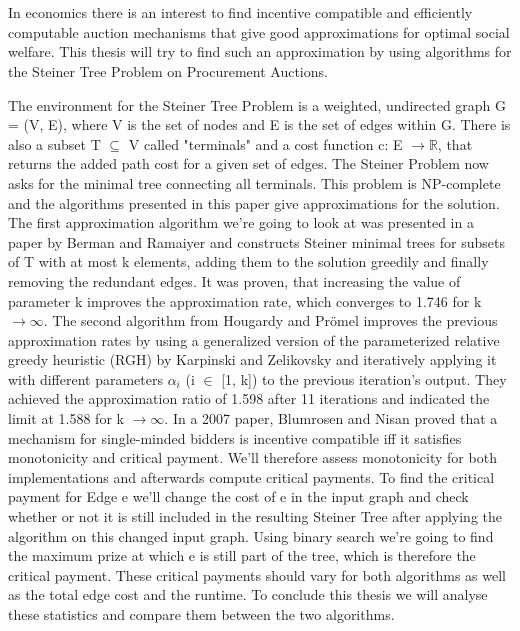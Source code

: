 \chapter{\abstractname}


In economics there is an interest to find incentive compatible and efficiently computable auction mechanisms that give good approximations for optimal social welfare. This thesis will try to find such an approximation by using algorithms for the Steiner Tree Problem on Procurement Auctions.%

The environment for the Steiner Tree Problem is a weighted, undirected graph G = (V, E), where V is the set of nodes and E is the set of edges within G. There is also a subset T $\subseteq$ V called "terminals" and a cost function c: E $\to \mathbb{R}$, that returns the added path cost for a given set of edges. The Steiner Problem now asks for the minimal tree connecting all terminals. This problem is NP-complete and the algorithms presented in this paper give approximations for the solution. The first approximation algorithm we're going to look at was presented in a paper by Berman and Ramaiyer \cite{BeRa94} and constructs Steiner minimal trees for subsets of T with at most k elements,  adding them to the solution greedily and finally removing the redundant edges. It was proven, that increasing the value of  parameter k improves the approximation rate, which converges to 1.746 for k $\to \infty$. The second algorithm from Hougardy and Prömel \cite{HoPr99} improves the previous approximation rates by using a generalized version of the parameterized relative greedy heuristic (RGH) by Karpinski and Zelikovsky \cite{KaZe97} and iteratively applying it with different parameters $\alpha_i$ (i $\in$ [1, k]) to the previous iteration's output. They achieved the approximation ratio of 1.598 after 11 iterations and indicated the limit at 1.588 for k $\to \infty$. 
In a 2007 paper, Blumrosen and Nisan \cite{BlNi07} proved that a mechanism for single-minded bidders is incentive compatible iff it satisfies monotonicity and critical payment. We'll therefore assess monotonicity for both implementations and afterwards compute critical payments. To find the critical payment for Edge e we'll change the cost of e in the input graph and check whether or not it is still included in the resulting Steiner Tree after applying the algorithm on this changed input graph. Using binary search we're going to find the maximum prize at which e is still part of the tree, which is therefore the critical payment. These critical payments should vary for both algorithms as well as the total edge cost and the runtime. To conclude this thesis we will analyse these statistics and compare them between the two algorithms.